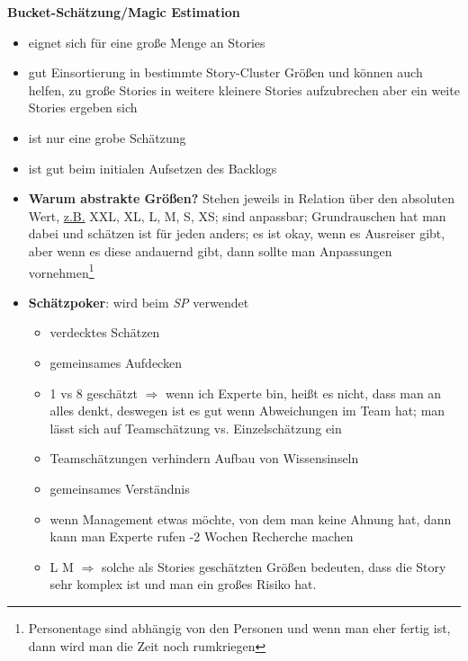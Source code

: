 \textbf{Bucket-Schätzung/Magic Estimation}
\begin{itemize}
  \item eignet sich für eine große Menge an Stories
  \item gut Einsortierung in bestimmte Story-Cluster Größen und können auch helfen, zu große
    Stories in weitere kleinere Stories aufzubrechen \oder aber ein weite Stories ergeben sich
  \item ist nur eine grobe Schätzung
  \item ist gut beim initialen Aufsetzen des Backlogs
  \item \textbf{Warum abstrakte Größen?} Stehen jeweils in Relation über den absoluten Wert,
    \uline{z.B.} XXL, XL, L, M, S, XS; sind anpassbar; Grundrauschen hat man dabei und schätzen ist
    für jeden anders; es ist okay, wenn es Ausreiser gibt, aber wenn es diese andauernd gibt,
    dann sollte man Anpassungen vornehmen\footnote{Personentage sind abhängig von den Personen und
      wenn man eher fertig ist, dann wird man die Zeit noch rumkriegen}
  \item \textbf{Schätzpoker}: wird beim \textit{SP} verwendet
    \begin{itemize}
      \item verdecktes Schätzen
      \item gemeinsames Aufdecken
      \item 1 vs 8 geschätzt $\Rightarrow$  wenn ich Experte bin, heißt es nicht, dass man an
        alles denkt, deswegen ist es gut wenn Abweichungen im Team hat; man lässt sich auf
        Teamschätzung vs. Einzelschätzung ein
      \item Teamschätzungen verhindern Aufbau von Wissensinseln
      \item gemeinsames Verständnis
      \item wenn Management etwas möchte, von dem man keine Ahnung hat, dann kann man Experte
        rufen -2 Wochen Recherche machen
      \item L \oder M $\Rightarrow$  solche als Stories geschätzten Größen bedeuten, dass die
        Story sehr komplex ist und man ein großes Risiko hat.
    \end{itemize}
\end{itemize}
\pagebreak



